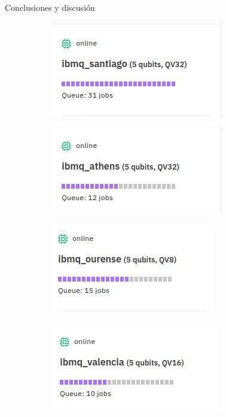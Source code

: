 \begin{frame}{Conclusiones y discusión}
    \begin{figure}[H]
    \begin{subfigure}{0.19\linewidth}
        \centering
        \includegraphics[scale=0.35]{images/santiago.png}
    \end{subfigure}
    \begin{subfigure}{0.19\linewidth}
        \centering
        \includegraphics[scale=0.35]{images/athrens.png}
    \end{subfigure}
    \begin{subfigure}{0.19\linewidth}
        \centering
        \includegraphics[scale=0.35]{images/ourense.png}
    \end{subfigure}
    \begin{subfigure}{0.19\linewidth}
        \centering
        \includegraphics[scale=0.35]{images/valencia.png}

\end{subfigure}
\end{figure}
\end{frame}
